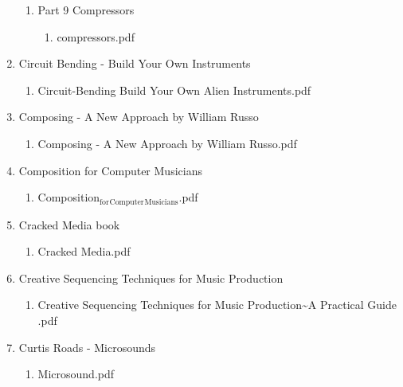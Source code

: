 \documentclass[11pt]{article}
\begin{document}
\begin{enumerate}
\begin{enumerate}
\item Part 9 Compressors
\label{sec-1-1-1-1-49-1-5-5-17}
\begin{enumerate}
\item compressors.pdf
\label{sec-1-1-1-1-49-1-5-5-17-1}
\end{enumerate}
\end{enumerate}

\item Circuit Bending - Build Your Own Instruments
\label{sec-1-1-1-1-49-1-5-6}
\begin{enumerate}
\item Circuit-Bending Build Your Own Alien Instruments.pdf
\label{sec-1-1-1-1-49-1-5-6-1}
\end{enumerate}

\item Composing - A New Approach by William Russo
\label{sec-1-1-1-1-49-1-5-7}
\begin{enumerate}
\item Composing - A New Approach by William Russo.pdf
\label{sec-1-1-1-1-49-1-5-7-1}
\end{enumerate}

\item Composition for Computer Musicians
\label{sec-1-1-1-1-49-1-5-8}
\begin{enumerate}
\item Composition$_{\text{for}}$$_{\text{Computer}}$$_{\text{Musicians}}$.pdf
\label{sec-1-1-1-1-49-1-5-8-1}
\end{enumerate}

\item Cracked Media book
\label{sec-1-1-1-1-49-1-5-9}
\begin{enumerate}
\item Cracked Media.pdf
\label{sec-1-1-1-1-49-1-5-9-1}
\end{enumerate}

\item Creative Sequencing Techniques for Music Production
\label{sec-1-1-1-1-49-1-5-10}
\begin{enumerate}
\item Creative Sequencing Techniques for Music Production\textasciitilde{}A Practical Guide \footnotemark[2]{}.pdf
\label{sec-1-1-1-1-49-1-5-10-1}
\end{enumerate}

\item Curtis Roads - Microsounds
\label{sec-1-1-1-1-49-1-5-11}
\begin{enumerate}
\item Microsound.pdf
\label{sec-1-1-1-1-49-1-5-11-1}
\end{enumerate}


\end{enumerate}
\end{document}
